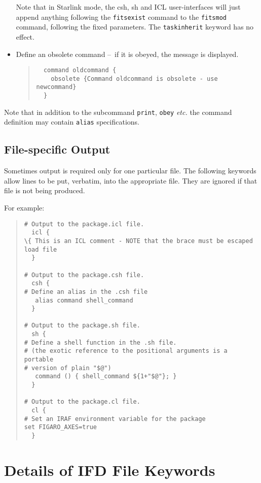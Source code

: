 \documentclass[twoside,11pt]{article}
\newcommand{\xlabel}[1]{}
\newcommand{\dash}{--}
\newcommand{\dash}{-}
\begin{document}
\begin{itemize}
Note that in Starlink mode, the csh, sh and ICL user-interfaces will just
append anything following the \texttt{fitsexist} command to the 
\texttt{fitsmod} command, following the fixed parameters. The
\texttt{taskinherit} keyword has no effect.
\item Define an obsolete command \dash\ if it is obeyed, the message is 
displayed.
\begin{quote} \begin{verbatim}
  command oldcommand {
    obsolete {Command oldcommand is obsolete - use newcommand}
  }
\end{verbatim} \end{quote}
\end{itemize}

Note that in addition to the subcommand \texttt{print}, \texttt{obey} 
\textit{etc.} the command definition may contain \texttt{alias} 
specifications.

\subsection{\xlabel{filespecific_output}File-specific Output}
Sometimes output is required only for one particular file. The following
keywords allow lines to be put, verbatim, into the appropriate file.
They are ignored if that file is not being produced.

For example:

\begin{quote} \begin{verbatim}
# Output to the package.icl file.
  icl {
\{ This is an ICL comment - NOTE that the brace must be escaped
load file
  }

# Output to the package.csh file.
  csh {
# Define an alias in the .csh file
   alias command shell_command
  }

# Output to the package.sh file.
  sh {
# Define a shell function in the .sh file.
# (the exotic reference to the positional arguments is a portable
# version of plain "$@")
   command () { shell_command ${1+"$@"}; }
  } 

# Output to the package.cl file.
  cl {
# Set an IRAF environment variable for the package
set FIGARO_AXES=true
  }
\end{verbatim} \end{quote}

\newpage
\section{\xlabel{details_of_ifd_file_keywords}\label{keywords}Details of IFD 
File Keywords}
\end{document}
